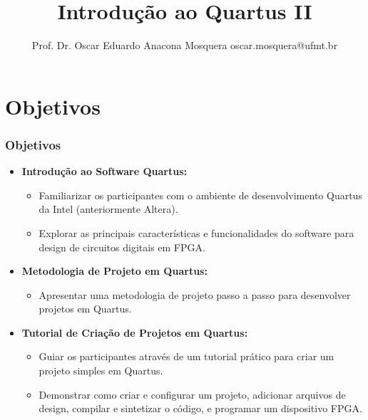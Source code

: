 \documentclass{CPSPresentation}
\title[Minicurso FPGAs]{\huge Introdução ao Quartus II}
\author[Prof. Dr. Oscar Eduardo Anacona Mosquera]{Prof. Dr. Oscar Eduardo Anacona Mosquera \newline\newline 
\scriptsize{oscar.mosquera@ufmt.br}
}
\begin{document}
\begin{frame}[plain]
\titlepage

\end{frame}




\section{Objetivos}

\begin{frame}
	\frametitle{Objetivos}
	
	\begin{itemize}
		\item \textbf{Introdução ao Software Quartus:}
		\begin{itemize}
			\item Familiarizar os participantes com o ambiente de desenvolvimento Quartus da Intel (anteriormente Altera).
			\item Explorar as principais características e funcionalidades do software para design de circuitos digitais em FPGA.
		\end{itemize}
		
		\item \textbf{Metodologia de Projeto em Quartus:}
		\begin{itemize}
			\item Apresentar uma metodologia de projeto passo a passo para desenvolver projetos em Quartus.
		\end{itemize}
		
		\item \textbf{Tutorial de Criação de Projetos em Quartus:}
		\begin{itemize}
			\item Guiar os participantes através de um tutorial prático para criar um projeto simples em Quartus.
			\item Demonstrar como criar e configurar um projeto, adicionar arquivos de design, compilar e sintetizar o código, e programar um dispositivo FPGA.
		\end{itemize}
	\end{itemize}
\end{frame}
\end{document}
